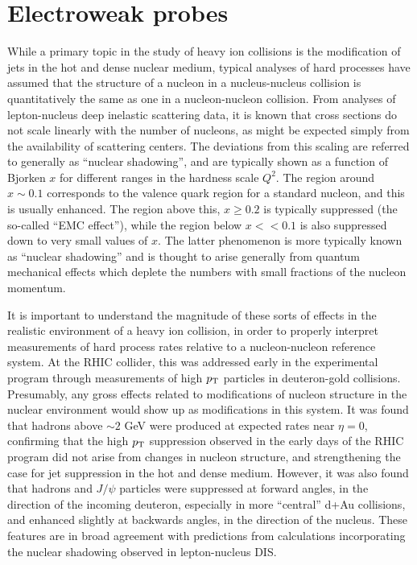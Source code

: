 \section{Electroweak probes}
\label{sect:pas:ew}

While a primary topic in the study of heavy ion collisions is the modification
of jets in the hot and dense nuclear medium, typical analyses of
hard processes have assumed that the
structure of a nucleon in a nucleus-nucleus collision is quantitatively the
same as one in a nucleon-nucleon collision.
From analyses of lepton-nucleus deep inelastic scattering data,
it is known that cross sections do not scale linearly with the number of nucleons,
as might be expected simply from the availability of scattering centers.
The deviations from this scaling are referred to generally as ``nuclear shadowing'',
and are typically shown as a function of Bjorken $x$ for different ranges in the
hardness scale $Q^2$.
The region around $x \sim 0.1$ corresponds to the valence quark region for a standard
nucleon, and this is usually enhanced.  The region above this, $x \geq 0.2$ is typically
suppressed (the so-called ``EMC effect''), while the region below $x << 0.1$ is also
suppressed down to very small values of $x$.  The latter phenomenon is more
typically known as ``nuclear shadowing'' and is thought to arise generally from 
quantum mechanical effects which deplete the numbers with small fractions of the
nucleon momentum.
  
It is important to understand the magnitude of these sorts of effects in 
the realistic environment of a heavy ion collision, in order to properly interpret
measurements of hard process rates relative to a nucleon-nucleon reference system.
At the RHIC collider, this was addressed early in the experimental program 
through measurements of high $\mbox{$p_{\mathrm{T}}$}$ particles in deuteron-gold collisions.
Presumably, any gross effects related to modifications of nucleon structure in the
nuclear environment would show up as modifications in this system.  It was found that
hadrons above $\sim 2$ GeV were produced at expected rates near $\eta =0$, confirming that
the high $\mbox{$p_{\mathrm{T}}$}$ suppression observed in the early days of the RHIC program did not
arise from changes in nucleon structure, and strengthening the case for jet suppression
in the hot and dense medium.
However, it was also found that hadrons and $J/\psi$ particles were suppressed at 
forward angles, in the direction of the incoming deuteron, especially in more ``central'' 
d+Au collisions, and enhanced slightly at backwards angles, in the direction of the
nucleus.  These features are in broad agreement with predictions from calculations
incorporating the nuclear shadowing observed in lepton-nucleus DIS.

